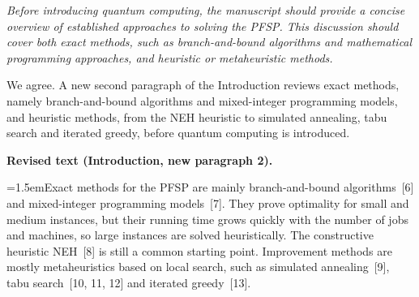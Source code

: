 \documentclass[12pt]{article}
\newenvironment{rc}[1]{\par\medskip\noindent\itshape\renewcommand{\emph}[1]{\textbf{##1}}\ignorespaces}{\par}
\newcommand{\answer}[1]{\par\smallskip\noindent #1\par}
\newcommand{\change}[3]{\par\smallskip\noindent\textbf{Revised text (#1).}\par
  {\leftskip=1.5em\noindent#3\par}}
\begin{document}
\begin{rc}{R2.1b --- Overview of classical PFSP methods}
Before introducing quantum computing, the manuscript should provide a concise overview of established approaches to solving the PFSP. This discussion should cover both exact methods, such as branch-and-bound algorithms and mathematical programming approaches, and heuristic or metaheuristic methods.
\end{rc}
\answer{We agree. A new second paragraph of the Introduction reviews exact methods, namely branch-and-bound algorithms and mixed-integer programming models, and heuristic methods, from the NEH heuristic to simulated annealing, tabu search and iterated greedy, before quantum computing is introduced.}
\change{Introduction, new paragraph 2}{\textit{(no counterpart in the original manuscript)}}{Exact methods for the PFSP are mainly branch-and-bound algorithms~[6] and mixed-integer programming models~[7]. They prove optimality for small and medium instances, but their running time grows quickly with the number of jobs and machines, so large instances are solved heuristically. The constructive heuristic NEH~[8] is still a common starting point. Improvement methods are mostly metaheuristics based on local search, such as simulated annealing~[9], tabu search~[10, 11, 12] and iterated greedy~[13].}
\end{document}
